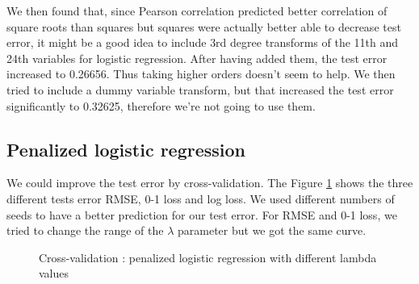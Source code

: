 \documentclass{article} %
\begin{document}
We then found that, since Pearson correlation predicted better correlation of square roots than squares but squares were actually better able to decrease test error, it might be a good idea to include 3rd degree transforms of the 11th and 24th variables for logistic regression. After having added them, the test error increased to 0.26656. Thus taking higher orders doesn’t seem to help. We then tried to include a dummy variable transform, but that increased the test error significantly to 0.32625, therefore we’re not going to use them.
\subsection{Penalized logistic regression}
We could improve the test error by cross-validation. The Figure \ref{fig:crossval} shows the three different tests error RMSE, 0-1 loss and log loss. We used different numbers of seeds to have a better prediction for our test error. For RMSE and 0-1 loss, we tried to change the range of the $\lambda$ parameter but we got the same curve.
\begin{figure}
\centering
{}
\caption{Cross-validation : penalized logistic regression with different lambda values}
\label{fig:crossval}
\end{figure} 
\end{document}
